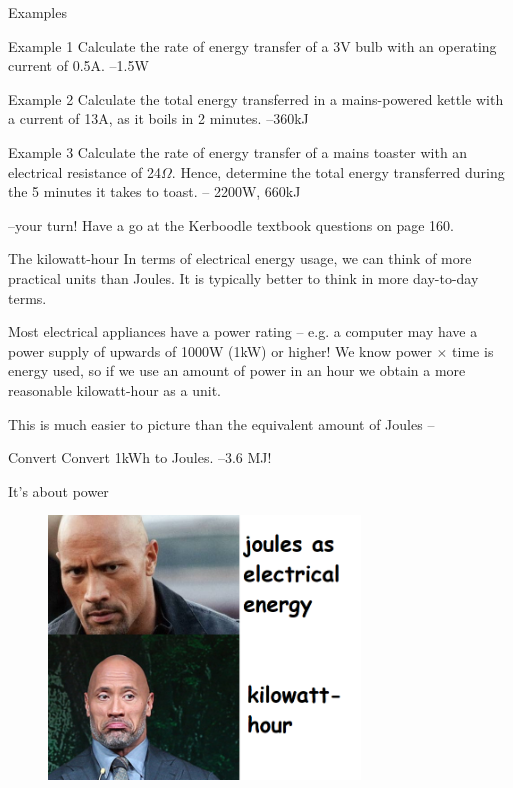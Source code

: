 \documentclass[../Main.tex]{subfiles}
\begin{document}
\begin{frame}{Examples}
    \begin{exampleblock}{Example 1}
    Calculate the rate of energy transfer of a 3V bulb with an operating current of 0.5A. \pause
    --1.5W
    \end{exampleblock}
    \pause
    \begin{exampleblock}{Example 2}
    Calculate the total energy transferred in a mains-powered kettle with a current of 13A, as it boils in 2 minutes. \pause
    --360kJ
    \end{exampleblock}
    \pause
    \begin{exampleblock}{Example 3}
    Calculate the rate of energy transfer of a mains toaster with an electrical resistance of 24$\Omega$. Hence, determine the total energy transferred during the 5 minutes it takes to toast. \pause
    -- 2200W, 660kJ
    \end{exampleblock}
    \pause
    --your turn! Have a go at the Kerboodle textbook questions on page 160.
\end{frame}

\begin{frame}{The kilowatt-hour}
    In terms of electrical energy usage, we can think of more practical units than Joules. It is typically better to think in more day-to-day terms. \newline
    
    Most electrical appliances have a power rating -- e.g. a computer may have a power supply of upwards of 1000W (1kW) or higher! We know power $\times$ time is energy used, so if we use an amount of power in an hour we obtain a more reasonable kilowatt-hour as a unit. \newline
    
    This is much easier to picture than the equivalent amount of Joules --
    \begin{exampleblock}{Convert}
    Convert 1kWh to Joules. \pause
    --3.6 MJ!
    \end{exampleblock}
\end{frame}

\begin{frame}{It's about power}
    \begin{figure}
        \centering
        \includegraphics[height=7cm]{Electricity_Images/its_about_power.png}
    \end{figure}
\end{frame}
\end{document}
